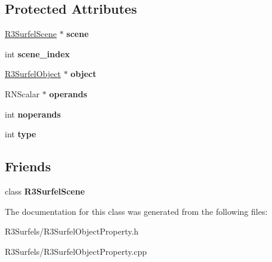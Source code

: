 \subsection*{Protected Attributes}
\begin{DoxyCompactItemize}
\item 
\hyperlink{class_r3_surfel_scene}{R3\+Surfel\+Scene} $\ast$ {\bfseries scene}\hypertarget{class_r3_surfel_object_property_a42e6ec5cecdb07fa8884f1f44d4db049}{}\label{class_r3_surfel_object_property_a42e6ec5cecdb07fa8884f1f44d4db049}

\item 
int {\bfseries scene\+\_\+index}\hypertarget{class_r3_surfel_object_property_ad391cffd7ab3ca2eb7959aadc3a4225d}{}\label{class_r3_surfel_object_property_ad391cffd7ab3ca2eb7959aadc3a4225d}

\item 
\hyperlink{class_r3_surfel_object}{R3\+Surfel\+Object} $\ast$ {\bfseries object}\hypertarget{class_r3_surfel_object_property_a6acdb52c04f7ad4efe09fc6e3476672b}{}\label{class_r3_surfel_object_property_a6acdb52c04f7ad4efe09fc6e3476672b}

\item 
R\+N\+Scalar $\ast$ {\bfseries operands}\hypertarget{class_r3_surfel_object_property_a7ca6445039ecfcbf57056c1892dafed5}{}\label{class_r3_surfel_object_property_a7ca6445039ecfcbf57056c1892dafed5}

\item 
int {\bfseries noperands}\hypertarget{class_r3_surfel_object_property_a30a64c964a7ce215f49408fe82eee15e}{}\label{class_r3_surfel_object_property_a30a64c964a7ce215f49408fe82eee15e}

\item 
int {\bfseries type}\hypertarget{class_r3_surfel_object_property_ad1221a4524f7fcdc29417d16f6acd3ee}{}\label{class_r3_surfel_object_property_ad1221a4524f7fcdc29417d16f6acd3ee}

\end{DoxyCompactItemize}
\subsection*{Friends}
\begin{DoxyCompactItemize}
\item 
class {\bfseries R3\+Surfel\+Scene}\hypertarget{class_r3_surfel_object_property_af9bb32c0eac7d1d54787bbc6b44586b6}{}\label{class_r3_surfel_object_property_af9bb32c0eac7d1d54787bbc6b44586b6}

\end{DoxyCompactItemize}


The documentation for this class was generated from the following files\+:\begin{DoxyCompactItemize}
\item 
R3\+Surfels/R3\+Surfel\+Object\+Property.\+h\item 
R3\+Surfels/R3\+Surfel\+Object\+Property.\+cpp\end{DoxyCompactItemize}
